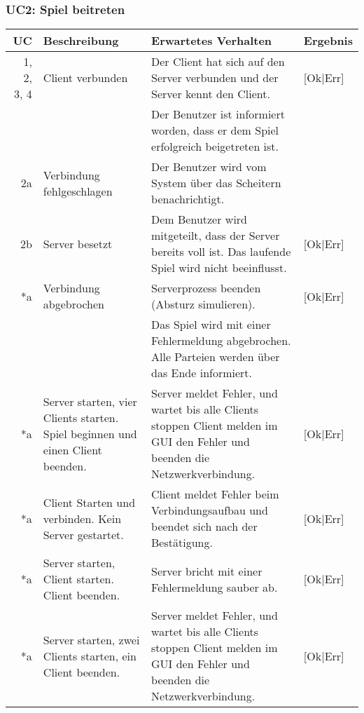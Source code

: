 \documentclass[12pt,halfparskip]{scrartcl}
\begin{document}
\subsubsection{UC2: Spiel beitreten}
	\begin {tabular}{r | p{3cm} | p{8cm} | l}
		\toprule
		\textbf{UC} & \textbf{Beschreibung} & \textbf{Erwartetes Verhalten} & \textbf{Ergebnis} \\
		\midrule
		1, 2, 3, 4 & Client verbunden & Der Client hat sich auf den Server verbunden und der Server kennt den Client. & [Ok|Err] \\
		 \cline{3-4} & & Der Benutzer ist informiert worden, dass er dem Spiel erfolgreich beigetreten ist. & \\
		\midrule
		2a & Verbindung fehlgeschlagen & Der Benutzer wird vom System über das Scheitern benachrichtigt. &   \\
		\midrule
		2b & Server besetzt & Dem Benutzer wird mitgeteilt, dass der Server bereits voll ist. Das laufende Spiel wird nicht beeinflusst. & [Ok|Err] \\
		\midrule
		*a & Verbindung abgebrochen & Serverprozess beenden (Absturz simulieren). & [Ok|Err]  \\
		\cline{3-4} & & Das Spiel wird mit einer Fehlermeldung abgebrochen. Alle Parteien werden über das Ende informiert. & \\
		\midrule
		*a & Server starten, vier Clients starten. Spiel beginnen und einen Client beenden. & Server meldet Fehler, und wartet bis alle Clients stoppen Client melden im GUI den Fehler und beenden die Netzwerkverbindung. & [Ok|Err] \\
		\midrule
		*a & Client Starten und verbinden. Kein Server gestartet. & Client meldet Fehler beim Verbindungsaufbau und beendet sich nach der Bestätigung. & [Ok|Err] \\
		\midrule
		*a & Server starten, Client starten. Client beenden. & Server bricht mit einer Fehlermeldung sauber ab. & [Ok|Err] \\
		\midrule
		*a & Server starten, zwei Clients starten, ein Client beenden. & Server meldet Fehler, und wartet bis alle Clients stoppen Client melden im GUI den Fehler und beenden die Netzwerkverbindung. & [Ok|Err]  \\
		\bottomrule
	\end{tabular}
	
\end{document}
